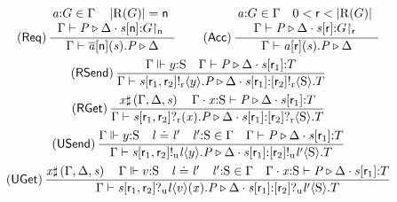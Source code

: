 \begin{figure}[tp]
	\centering
	\[ \begin{array}{c}
		\left( \textsf{Req} \right) \dfrac{\!\!\begin{array}{c} \Typed{\Chan[a]}{\GT} \in \Gamma \quad \Length{\Roles{\GT}} = \Role[n] \\ \Gamma \vdash \PT \triangleright \Delta \compS \Typed{\AT{\Chan}{\Role[n]}}{\Proj{\GT}{\Role[n]}} \end{array}}{\Gamma \vdash \PReq{\Chan[a]}{\Role[n]}{\Chan}{\PT} \triangleright \Delta} \hspace{2em}
		\left( \textsf{Acc} \right) \dfrac{\!\!\begin{array}{c} \Typed{\Chan[a]}{\GT} \in \Gamma \quad 0 < \Role < \Length{\Roles{\GT}} \\ \Gamma \vdash \PT \triangleright \Delta \compS \Typed{\AT{\Chan}{\Role}}{\Proj{\GT}{\Role}} \end{array}}{\Gamma \vdash \PAcc{\Chan[a]}{\Role}{\Chan}{\PT} \triangleright \Delta} \vspace{0.5em}\\
		\left( \textsf{RSend} \right) \dfrac{\Gamma \Vdash \Typed{\Expr[y]}{\Sort} \quad \Gamma \vdash \PT \triangleright \Delta \compS \Typed{\AT{\Chan}{\Role_1}}{\LT}}{\Gamma \vdash \PSendR{\Chan}{\Role_1}{\Role_2}{\Expr[y]}{\PT} \triangleright \Delta \compS \Typed{\AT{\Chan}{\Role_1}}{\LSendR{\Role_2}{\Sort}{\LT}}} \vspace{0.5em}\\
		\left( \textsf{RGet} \right) \dfrac{\Args \sharp \left( \Gamma, \Delta, \Chan \right) \quad \Gamma \compS \Typed{\Args}{\Sort} \vdash \PT \triangleright \Delta \compS \Typed{\AT{\Chan[s]}{\Role_1}}{\LT}}{\Gamma \vdash \PGetR{\Chan}{\Role_1}{\Role_2}{\Args}{\PT} \triangleright \Delta \compS \Typed{\AT{\Chan}{\Role_1}}{\LGetR{\Role_2}{\Sort}{\LT}}} \vspace{0.5em}\\
		\left( \textsf{USend} \right) \dfrac{\Gamma \Vdash \Typed{\Expr[y]}{\Sort} \quad \Label \compL \Label' \quad \Typed{\Label'}{\Sort} \in \Gamma \quad \Gamma \vdash \PT \triangleright \Delta \compS \Typed{\AT{\Chan}{\Role_1}}{\LT}}{\Gamma \vdash \PSendU{\Chan}{\Role_1}{\Role_2}{\Label}{\Expr[y]}{\PT} \triangleright \Delta \compS \Typed{\AT{\Chan}{\Role_1}}{\LSendU{\Role_2}{\Label'}{\Sort}{\LT}}} \vspace{0.5em}\\
		\left( \textsf{UGet} \right) \dfrac{\Args \sharp \left( \Gamma, \Delta, \Chan \right) \quad \Gamma \Vdash \Typed{\Expr[v]}{\Sort} \quad \Label \compL \Label' \quad \Typed{\Label'}{\Sort} \in \Gamma \quad \Gamma \compS \Typed{\Args}{\Sort} \vdash \PT \triangleright \Delta \compS \Typed{\AT{\Chan[s]}{\Role_1}}{\LT}}{\Gamma \vdash \PGetU{\Chan}{\Role_1}{\Role_2}{\Label}{\Expr[v]}{\Args}{\PT} \triangleright \Delta \compS \Typed{\AT{\Chan}{\Role_1}}{\LGetU{\Role_2}{\Label'}{\Sort}{\LT}}} \vspace{0.5em}\\

\end{array}\]
\end{figure}
